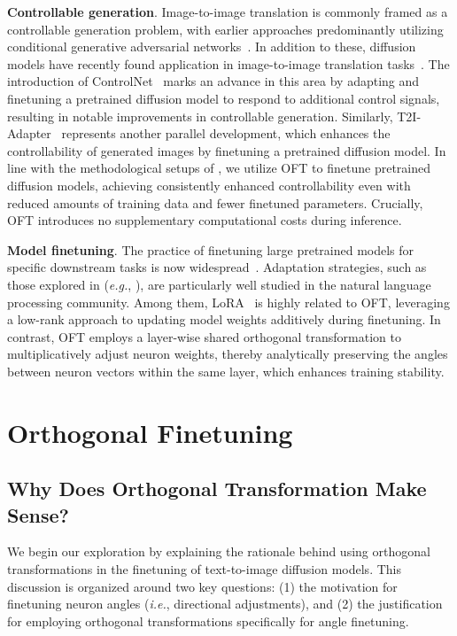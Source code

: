 \textbf{Controllable generation}. Image-to-image translation is commonly framed as a controllable generation problem, with earlier approaches predominantly utilizing conditional generative adversarial networks~\cite{isola2017image,zhu2017toward,wang2018high,park2019semantic,choi2018stargan}. In addition to these, diffusion models have recently found application in image-to-image translation tasks~\cite{saharia2022palette,voynov2022sketch,wang2022pretraining}. The introduction of ControlNet~\cite{zhang2023adding} marks an advance in this area by adapting and finetuning a pretrained diffusion model to respond to additional control signals, resulting in notable improvements in controllable generation. Similarly, T2I-Adapter~\cite{mou2023t2i} represents another parallel development, which enhances the controllability of generated images by finetuning a pretrained diffusion model. In line with the methodological setups of \cite{zhang2023adding,mou2023t2i}, we utilize OFT to finetune pretrained diffusion models, achieving consistently enhanced controllability even with reduced amounts of training data and fewer finetuned parameters. Crucially, OFT introduces no supplementary computational costs during inference.

\textbf{Model finetuning}. The practice of finetuning large pretrained models for specific downstream tasks is now widespread~\cite{devlin2018bert,brown2020language,he2022masked}. Adaptation strategies, such as those explored in (\emph{e.g.}, \cite{hulora2022,houlsby2019parameter,pfeiffer2020adapterfusion}), are particularly well studied in the natural language processing community. Among them, LoRA~\cite{hulora2022} is highly related to OFT, leveraging a low-rank approach to updating model weights additively during finetuning. In contrast, OFT employs a layer-wise shared orthogonal transformation to multiplicatively adjust neuron weights, thereby analytically preserving the angles between neuron vectors within the same layer, which enhances training stability.

\section{Orthogonal Finetuning}

\subsection{Why Does Orthogonal Transformation Make Sense?}

We begin our exploration by explaining the rationale behind using orthogonal transformations in the finetuning of text-to-image diffusion models. This discussion is organized around two key questions: (1) the motivation for finetuning neuron angles (\emph{i.e.}, directional adjustments), and (2) the justification for employing orthogonal transformations specifically for angle finetuning.

